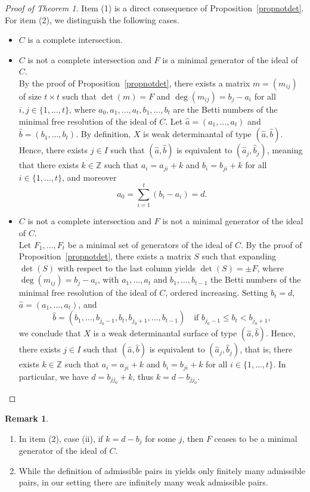 \documentclass[12pt,reqno]{amsart}
\theoremstyle{plain}
\theoremstyle{definition}
\newtheorem{rmk}[theorem]{Remark}
\theoremstyle{remark}
\theoremstyle{definition}
\begin{document}
\begin{proof}[Proof of Theorem 1]
Item (1) is a direct consequence of Proposition~\ref{propnotdet}. For item (2), we distinguish the following cases.
\begin{itemize}
\item[Case 0:] $C$ is a complete intersection.

\item[Case 1:] $C$ is not a complete intersection and $F$ is a minimal generator of the ideal of $C$.\\
By the proof of Proposition~\ref{propnotdet}, there exists a matrix $m=(m_{ij})$ of size $t\times t$ such that $\det(m)=F$ and $\deg(m_{ij})=b_j-a_i$ for all $i,j\in\{1,\ldots,t\}$, where $a_0,a_1,\ldots,a_t,b_1,\ldots,b_t$ are the Betti numbers of the minimal free resolution of the ideal of $C$. Let $\hat{a}=(a_1,\ldots,a_t)$ and $\hat{b}=(b_1,\ldots,b_t)$. By definition, $X$ is weak determinantal of type $(\hat{a},\hat{b})$. Hence, there exists $j\in I$ such that $(\hat{a},\hat{b})$ is equivalent to $(\hat{a}_j,\hat{b}_j)$, meaning that there exists $k\in\mathds{Z}$ such that $a_i=a_{ji}+k$ and $b_i=b_{ji}+k$ for all $i\in\{1,\ldots,t\}$, and moreover
\[
a_0=\sum_{i=1}^{t}(b_i-a_i)=d.
\]

\item[Case 2:] $C$ is not a complete intersection and $F$ is not a minimal generator of the ideal of $C$.\\
Let $F_1,\ldots,F_t$ be a minimal set of generators of the ideal of $C$. By the proof of Proposition~\ref{propnotdet}, there exists a matrix $S$ such that expanding $\det(S)$ with respect to the last column yields $\det(S)=\pm F$, where $\deg(m_{ij})=b_j-a_i$, with $a_1,\ldots,a_t$ and $b_1,\ldots,b_{t-1}$ the Betti numbers of the minimal free resolution of the ideal of $C$, ordered increasing. Setting $b_t=d$, $\hat{a}=(a_1,\ldots,a_t)$, and
\[
\hat{b}=(b_1,\ldots,b_{j_0-1},b_t,b_{j_0+1},\ldots,b_{t-1})
\quad\text{if } b_{j_0-1}\leq b_t<b_{j_0+1},
\]
we conclude that $X$ is a weak determinantal surface of type $(\hat{a},\hat{b})$. Hence, there exists $j\in I$ such that $(\hat{a},\hat{b})$ is equivalent to $(\hat{a}_j,\hat{b}_j)$, that is, there exists $k\in\mathds{Z}$ such that $a_i=a_{ji}+k$ and $b_i=b_{ji}+k$ for all $i\in\{1,\ldots,t\}$. In particular, we have $d=b_{jj_0}+k$, thus $k=d-b_{jj_0}$.
\end{itemize}
\end{proof}

\begin{rmk}
\begin{enumerate}
\item In item (2), case (ii), if $k=d-b_j$ for some $j$, then $F$ ceases to be a minimal generator of the ideal of $C$.
\item While the definition of admissible pairs in \cite{LLV} yields only finitely many admissible pairs, in our setting there are infinitely many weak admissible pairs.
\end{enumerate}
\end{rmk}
\end{document}
